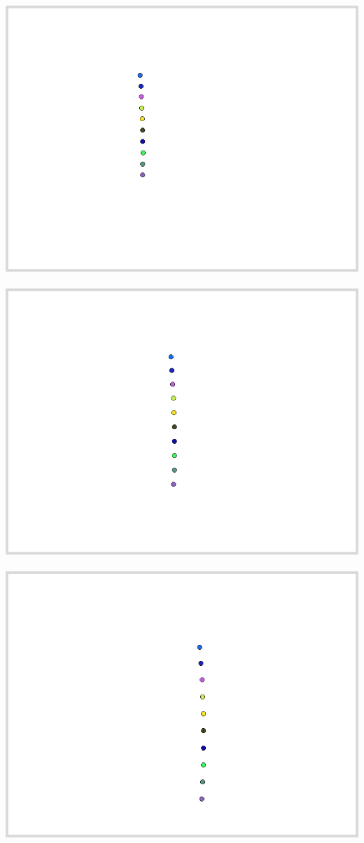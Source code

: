 \documentclass[11pt,class=report,crop=false]{standalone}
\begin{document}
\begin{activite}
\begin{center}
\includegraphics[scale=\myscale,scale=0.18]{ecran-mouvement-030}\ 
\includegraphics[scale=\myscale,scale=0.18]{ecran-mouvement-040}\ 
\includegraphics[scale=\myscale,scale=0.18]{ecran-mouvement-050}
\end{center}	 


\end{activite}
\end{document}
